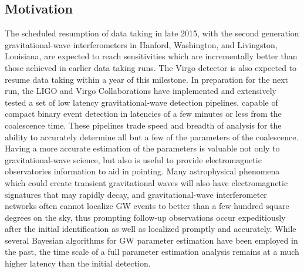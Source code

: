 \newcommand\itrprm{\vec{\lambda}}
\newcommand\etrprm{\vec{\theta}}

\subsection{Motivation}

The scheduled resumption of data taking in late 2015\cite{observingdocument}, with the second generation gravitational-wave interferometers in Hanford, Washington, and Livingston, Louisiana, are expected to reach sensitivities which are incrementally better than those achieved in earlier data taking runs\cite{s5s6}. The Virgo detector is also expected to resume data taking within a year of this milestone. In preparation for the next run, the LIGO and Virgo Collaborations have implemented and extensively tested a set of low latency gravitational-wave detection pipelines\cite{gstlal,mbta,cwb}, capable of compact binary event detection in latencies of a few minutes or less from the coalescence time. These pipelines trade speed and breadth of analysis for the ability to accurately determine all but a few of the parameters of the coalescence. Having a more accurate estimation of the parameters is valuable not only to gravitational-wave science, but also is useful to provide electromagnetic observatories information to aid in pointing. Many astrophysical phenomena which could create transient gravitational waves will also have electromagnetic signatures that may rapidly decay, and gravitational-wave interferometer networks often cannot localize GW events to better than a few hundred square degrees on the sky\cite{skylocpapers}, thus prompting follow-up observations occur expeditiously after the initial identification as well as localized promptly and accurately. While several Bayesian algorithms for GW parameter estimation have been employed in the past, the time scale of a full parameter estimation analysis remains at a much higher latency than the initial detection.

